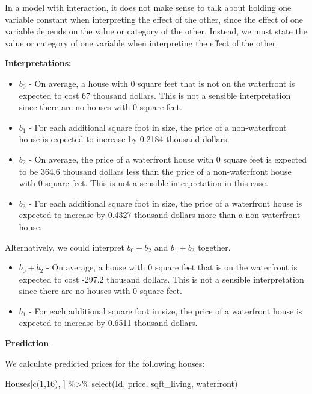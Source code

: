 \documentclass[
  letterpaper,
  DIV=11,
  numbers=noendperiod]{scrreprt}
\newenvironment{Shaded}{\begin{snugshade}}{\end{snugshade}}
\newcommand{\DecValTok}[1]{\textcolor[rgb]{0.68,0.00,0.00}{#1}}
\newcommand{\FunctionTok}[1]{\textcolor[rgb]{0.28,0.35,0.67}{#1}}
\newcommand{\NormalTok}[1]{\textcolor[rgb]{0.00,0.23,0.31}{#1}}
\newcommand{\SpecialCharTok}[1]{\textcolor[rgb]{0.37,0.37,0.37}{#1}}
\begin{document}
In a model with interaction, it does not make sense to talk about
holding one variable constant when interpreting the effect of the other,
since the effect of one variable depends on the value or category of the
other. Instead, we must state the value or category of one variable when
interpreting the effect of the other.

\textbf{Interpretations:}

\begin{itemize}
\item
  \(b_0\) - On average, a house with 0 square feet that is not on the
  waterfront is expected to cost 67 thousand dollars. This is not a
  sensible interpretation since there are no houses with 0 square feet.
\item
  \(b_1\) - For each additional square foot in size, the price of a
  non-waterfront house is expected to increase by 0.2184 thousand
  dollars.
\item
  \(b_2\) - On average, the price of a waterfront house with 0 square
  feet is expected to be 364.6 thousand dollars less than the price of a
  non-waterfront house with 0 square feet. This is not a sensible
  interpretation in this case.
\item
  \(b_3\) - For each additional square foot in size, the price of a
  waterfront house is expected to increase by 0.4327 thousand dollars
  more than a non-waterfront house.
\end{itemize}

Alternatively, we could interpret \(b_0+b_2\) and \(b_1+b_3\) together.

\begin{itemize}
\item
  \(b_0 + b_2\) - On average, a house with 0 square feet that is on the
  waterfront is expected to cost -297.2 thousand dollars. This is not a
  sensible interpretation since there are no houses with 0 square feet.
\item
  \(b_1\) - For each additional square foot in size, the price of a
  waterfront house is expected to increase by 0.6511 thousand dollars.
\end{itemize}

\textbf{Prediction}

We calculate predicted prices for the following houses:

\begin{Shaded}
\begin{Highlighting}[]
\NormalTok{Houses[}\FunctionTok{c}\NormalTok{(}\DecValTok{1}\NormalTok{,}\DecValTok{16}\NormalTok{), ] }\SpecialCharTok{\%\textgreater{}\%} \FunctionTok{select}\NormalTok{(Id, price, sqft\_living, waterfront)}
\end{Highlighting}
\end{Shaded}
\end{document}
